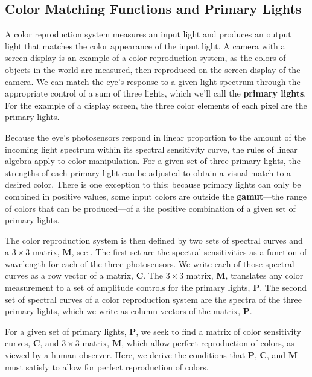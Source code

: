 \subsection{Color Matching Functions and Primary Lights}

A  color reproduction system measures an input light and produces an output light that matches the color appearance of the input light.  A camera with a screen display is an example of a color reproduction system, as the colors of objects in the world are measured, then reproduced on the screen display of the camera.  
We can match the eye's response to a given light spectrum through the appropriate control of a sum of three lights, which we'll call the {\bf primary lights}. For the example of a display screen, the three color elements of each pixel are the primary lights.  

Because the eye's photosensors respond in linear proportion to the amount of the incoming light spectrum within its spectral sensitivity curve, the rules of linear algebra apply to color manipulation.  For a given set of three primary lights, the strengths of each primary light can be adjusted to obtain a visual match to a desired color.  There is one exception to this: because primary lights can only be combined in positive values, some input colors are outside the {\bf gamut}---the range of colors that can be produced---of a the positive combination of a given set of primary lights.

The color reproduction system is then defined by two sets of spectral curves and a $3 \times 3$ matrix, $\mathbf{M}$, see \fig{\ref{fig:colorsystem}}.  The first set are the spectral sensitivities as a function of wavelength for each of the three photosensors.  We write each of those spectral curves as a row vector of a matrix, $\mathbf{C}$.  The $3 \times 3$ matrix, $\mathbf{M}$, translates any color measurement to a set of amplitude controls for the primary lights, $\mathbf{P}$. The second set of spectral curves of a color reproduction system are the spectra of the three primary lights, which we write as column vectors of the matrix, $\mathbf{P}$.

For a given set of primary lights, $\mathbf{P}$, we seek to find a matrix of color sensitivity curves, $\mathbf{C}$, and $3 \times 3$ matrix, $\mathbf{M}$, which allow perfect reproduction of colors, as viewed by a human observer.  Here, we derive the conditions
that $\mathbf{P}$,  $\mathbf{C}$, and $\mathbf{M}$ must satisfy to allow for perfect reproduction of colors.

